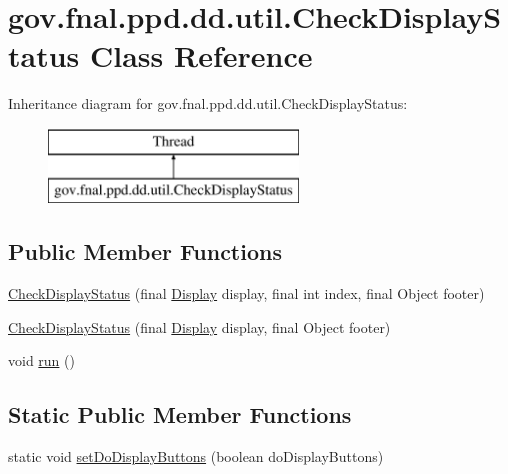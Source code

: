 \hypertarget{classgov_1_1fnal_1_1ppd_1_1dd_1_1util_1_1CheckDisplayStatus}{\section{gov.\-fnal.\-ppd.\-dd.\-util.\-Check\-Display\-Status Class Reference}
\label{classgov_1_1fnal_1_1ppd_1_1dd_1_1util_1_1CheckDisplayStatus}
}
Inheritance diagram for gov.\-fnal.\-ppd.\-dd.\-util.\-Check\-Display\-Status\-:\begin{figure}[H]
\begin{center}
\leavevmode
\includegraphics[height=2.000000cm]{classgov_1_1fnal_1_1ppd_1_1dd_1_1util_1_1CheckDisplayStatus}
\end{center}
\end{figure}
\subsection*{Public Member Functions}
\begin{DoxyCompactItemize}
\item 
\hyperlink{classgov_1_1fnal_1_1ppd_1_1dd_1_1util_1_1CheckDisplayStatus_af68b8d494c6ae7737435914663fb8772}{Check\-Display\-Status} (final \hyperlink{interfacegov_1_1fnal_1_1ppd_1_1dd_1_1signage_1_1Display}{Display} display, final int index, final Object footer)
\item 
\hyperlink{classgov_1_1fnal_1_1ppd_1_1dd_1_1util_1_1CheckDisplayStatus_ab11232ecbab98ce632939814a5814864}{Check\-Display\-Status} (final \hyperlink{interfacegov_1_1fnal_1_1ppd_1_1dd_1_1signage_1_1Display}{Display} display, final Object footer)
\item 
void \hyperlink{classgov_1_1fnal_1_1ppd_1_1dd_1_1util_1_1CheckDisplayStatus_a3961834b92c8dbca9dbc0b6b6f2c07a0}{run} ()
\end{DoxyCompactItemize}
\subsection*{Static Public Member Functions}
\begin{DoxyCompactItemize}
\item 
static void \hyperlink{classgov_1_1fnal_1_1ppd_1_1dd_1_1util_1_1CheckDisplayStatus_a4fca2b5bbab254e7d90d70f87de8ce41}{set\-Do\-Display\-Buttons} (boolean do\-Display\-Buttons)
\end{DoxyCompactItemize}


